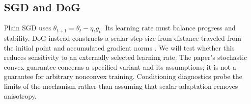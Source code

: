 \subsection{SGD and DoG}\label{sec:method-m1}

Plain SGD uses $\theta_{t+1}=\theta_t-\eta_tg_t$. Its learning rate must balance progress
and stability. DoG instead constructs a scalar step size from distance traveled from the
initial point and accumulated gradient norms \citep{ivgi2023dog}.
We will test whether this reduces sensitivity to an externally selected learning rate.
The paper's stochastic convex guarantee concerns a specified variant and its assumptions;
it is not a guarantee for arbitrary nonconvex training. Conditioning diagnostics probe the
limits of the mechanism rather than assuming that scalar adaptation removes anisotropy.

